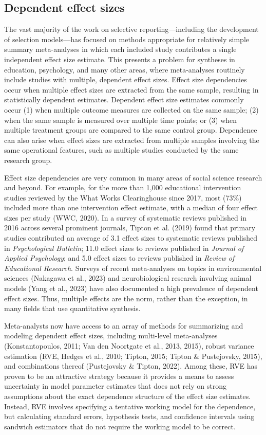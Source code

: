\documentclass[
  man, donotrepeattitle,floatsintext]{apa7}
\begin{document}
\subsection{Dependent effect sizes}\label{dependent-effect-sizes}

The vast majority of the work on selective reporting---including the development of selection models---has focused on methods appropriate for relatively simple summary meta-analyses in which each included study contributes a single independent effect size estimate.
This presents a problem for syntheses in education, psychology, and many other areas, where meta-analyses routinely include studies with multiple, dependent effect sizes.
Effect size dependencies occur when multiple effect sizes are extracted from the same sample, resulting in statistically dependent estimates.
Dependent effect size estimates commonly occur (1) when multiple outcome measures are collected on the same sample; (2) when the same sample is measured over multiple time points; or (3) when multiple treatment groups are compared to the same control group.
Dependence can also arise when effect sizes are extracted from multiple samples involving the same operational features, such as multiple studies conducted by the same research group.

Effect size dependencies are very common in many areas of social science research and beyond.
For example, for the more than 1,000 educational intervention studies reviewed by the What Works Clearinghouse since 2017, most (73\%) included more than one intervention effect estimate, with a median of four effect sizes per study (WWC, 2020).
In a survey of systematic reviews published in 2016 across several prominent journals, Tipton et al. (2019) found that primary studies contributed an average of 3.1 effect sizes to systematic reviews published in \emph{Psychological Bulletin}; 11.0 effect sizes to reviews published in \emph{Journal of Applied Psychology}; and 5.0 effect sizes to reviews published in \emph{Review of Educational Research}.
Surveys of recent meta-analyses on topics in environmental sciences (Nakagawa et al., 2023) and neurobiological research involving animal models (Yang et al., 2023) have also documented a high prevalence of dependent effect sizes.
Thus, multiple effects are the norm, rather than the exception, in many fields that use quantitative synthesis.

Meta-analysts now have access to an array of methods for summarizing and modeling dependent effect sizes, including multi-level meta-analyses (Konstantopoulos, 2011; Van den Noortgate et al., 2013, 2015), robust variance estimation (RVE, Hedges et al., 2010; Tipton, 2015; Tipton \& Pustejovsky, 2015), and combinations thereof (Pustejovsky \& Tipton, 2022).
Among these, RVE has proven to be an attractive strategy because it provides a means to assess uncertainty in model parameter estimates that does not rely on strong assumptions about the exact dependence structure of the effect size estimates.
Instead, RVE involves specifying a tentative working model for the dependence, but calculating standard errors, hypothesis tests, and confidence intervals using sandwich estimators that do not require the working model to be correct.
\end{document}
